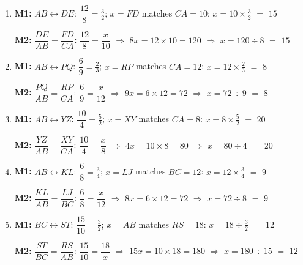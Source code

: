 \documentclass[11pt]{article}
\newcommand{\ans}[1]{\textcolor{fmans}{\textbf{#1}}}
\begin{document}
\begin{enumerate}[label=\textbf{\arabic*.},start=6,itemsep=2mm,leftmargin=*]
\item \textbf{M1:} $AB \leftrightarrow DE$: \;$\dfrac{12}{8} = \tfrac{3}{2}$; \; $x = FD$ matches $CA = 10$: \;$x = 10 \times \tfrac{3}{2}$ $=$ \ans{$15$}\par\textbf{M2:} $\dfrac{DE}{AB} = \dfrac{FD}{CA}$: \; $\dfrac{12}{8} = \dfrac{x}{10}$ \;$\Rightarrow$\; $8x = 12 \times 10 = 120$ \;$\Rightarrow$\; $x = 120 \div 8$ $=$ \ans{$15$}
\item \textbf{M1:} $AB \leftrightarrow PQ$: \;$\dfrac{6}{9} = \tfrac{2}{3}$; \; $x = RP$ matches $CA = 12$: \;$x = 12 \times \tfrac{2}{3}$ $=$ \ans{$8$}\par\textbf{M2:} $\dfrac{PQ}{AB} = \dfrac{RP}{CA}$: \; $\dfrac{6}{9} = \dfrac{x}{12}$ \;$\Rightarrow$\; $9x = 6 \times 12 = 72$ \;$\Rightarrow$\; $x = 72 \div 9$ $=$ \ans{$8$}
\item \textbf{M1:} $AB \leftrightarrow YZ$: \;$\dfrac{10}{4} = \tfrac{5}{2}$; \; $x = XY$ matches $CA = 8$: \;$x = 8 \times \tfrac{5}{2}$ $=$ \ans{$20$}\par\textbf{M2:} $\dfrac{YZ}{AB} = \dfrac{XY}{CA}$: \; $\dfrac{10}{4} = \dfrac{x}{8}$ \;$\Rightarrow$\; $4x = 10 \times 8 = 80$ \;$\Rightarrow$\; $x = 80 \div 4$ $=$ \ans{$20$}
\item \textbf{M1:} $AB \leftrightarrow KL$: \;$\dfrac{6}{8} = \tfrac{3}{4}$; \; $x = LJ$ matches $BC = 12$: \;$x = 12 \times \tfrac{3}{4}$ $=$ \ans{$9$}\par\textbf{M2:} $\dfrac{KL}{AB} = \dfrac{LJ}{BC}$: \; $\dfrac{6}{8} = \dfrac{x}{12}$ \;$\Rightarrow$\; $8x = 6 \times 12 = 72$ \;$\Rightarrow$\; $x = 72 \div 8$ $=$ \ans{$9$}
\item \textbf{M1:} $BC \leftrightarrow ST$: \;$\dfrac{15}{10} = \tfrac{3}{2}$; \; $x = AB$ matches $RS = 18$: \;$x = 18 \div \tfrac{3}{2}$ $=$ \ans{$12$}\par\textbf{M2:} $\dfrac{ST}{BC} = \dfrac{RS}{AB}$: \; $\dfrac{15}{10} = \dfrac{18}{x}$ \;$\Rightarrow$\; $15x = 10 \times 18 = 180$ \;$\Rightarrow$\; $x = 180 \div 15$ $=$ \ans{$12$}
\end{enumerate}
\end{document}
